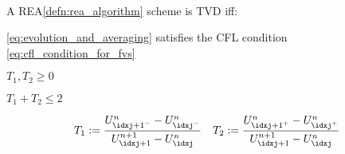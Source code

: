 \begin{lemmabox}\nospacing
    \begin{lemma}\label{eq:fvm_rea}\leavevmode\\
        A REA\cref{defn:rea_algorithm} scheme is TVD iff:
        \begin{circlelistnosep}
            \item \cref{eq:evolution_and_averaging} satisfies the CFL condition \cref{eq:cfl_condition_for_fvs}
            \item $T_{1},T_{2}\geq0$
            \item $T_{1}+T_{2}\leq2$
        \end{circlelistnosep}
        \begin{align}
          T_{1}:=\frac{U_{{\idxj+1}^{-}}^{n}-U_{\idxj^{-}}^{n}}{U_{\idxj+1}^{n+1}-U_{\idxj}^{n}}&&
          T_{2}:=\frac{U_{{\idxj+1}^{+}}^{n}-U_{\idxj^{+}}^{n}}{U_{\idxj+1}^{n+1}-U_{\idxj}^{n}}
        \end{align}
    \end{lemma}
\end{lemmabox}
